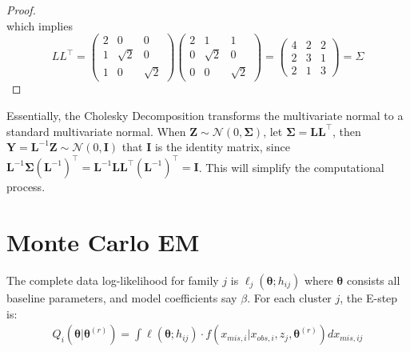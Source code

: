 \documentclass[preprint,12pt]{elsarticle}
\begin{document}
\begin{proof}
\begin{equation}
\end{equation}
which implies
\begin{equation}
    LL^{\top}=
    \begin{pmatrix}
        2 & 0 & 0 \\
        1 & \sqrt{2} & 0\\
        1 & 0 & \sqrt{2}
    \end{pmatrix}
    \begin{pmatrix}
        2 & 1 & 1 \\
        0 & \sqrt{2} & 0 \\
        0 & 0 & \sqrt{2}
    \end{pmatrix}
    =
    \begin{pmatrix}
        4 & 2 & 2\\
        2 & 3 & 1\\
        2 & 1 & 3
    \end{pmatrix}
    =\Sigma
\end{equation}
\end{proof}
Essentially, the Cholesky Decomposition transforms the multivariate normal to a standard multivariate normal. When $\mathbf{Z}\sim \mathcal{N}(0,\boldsymbol{\Sigma})$, let $\boldsymbol{\Sigma}=\mathbf{L}\mathbf{L}^{\top}$, then $\mathbf{Y}=\mathbf{L}^{-1}\mathbf{Z}\sim \mathcal{N}(0, \mathbf{I})$ that $\mathbf{I}$ is the identity matrix, since $\mathbf{L}^{-1}\boldsymbol{\Sigma}(\mathbf{L}^{-1})^{\top}=\mathbf{L}^{-1}\mathbf{L}\mathbf{L}^{\top}(\mathbf{L}^{-1})^{\top}=\mathbf{I}$. This will simplify the computational process. 
\section{Monte Carlo EM}
The complete data log-likelihood for family $j$ is $\ell_j(\boldsymbol{\theta}; h_{ij})$
where $\boldsymbol{\theta}$ consists all baseline parameters, and model coefficients say $\beta$. For each cluster $j$, the E-step is:
\begin{align} 
    Q_i(\boldsymbol{\theta}|\boldsymbol{\theta}^{(r)})=\int \ell(\boldsymbol{\theta};h_{ij})\cdot f(x_{mis,i}|x_{obs,i},z_j, \boldsymbol{\theta}^{(r)})dx_{mis,ij}
\end{align}
\end{document}
